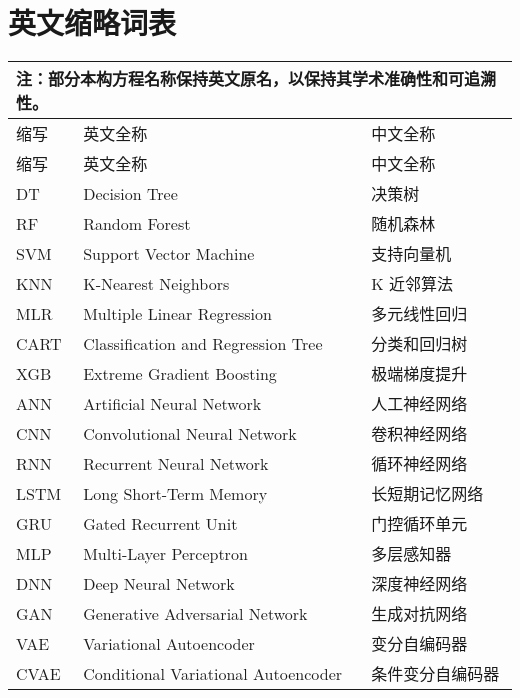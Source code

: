 \chapter{英文缩略词表}
\begin{longtable}{lll}
	\\
	\multicolumn{3}{p{\textwidth}}{\small 注：部分本构方程名称保持英文原名，以保持其学术准确性和可追溯性。}                                        \\
	\hline
	缩写       & 英文全称                                               & 中文全称                                           \\
	\hline
	\endfirsthead
	\hline
	缩写       & 英文全称                                               & 中文全称                                           \\
	\hline
	\endhead
	\hline
	\endfoot
	DT       & Decision Tree                                      & 决策树\tabularnewline
	RF       & Random Forest                                      & 随机森林\tabularnewline
	SVM      & Support Vector Machine                             & 支持向量机\tabularnewline
	KNN      & K-Nearest Neighbors                                & K 近邻算法\tabularnewline
	MLR      & Multiple Linear Regression                         & 多元线性回归\tabularnewline
	CART     & Classification and Regression Tree                 & 分类和回归树\tabularnewline
	XGB      & Extreme Gradient Boosting                          & 极端梯度提升\tabularnewline

	ANN      & Artificial Neural Network                          & 人工神经网络\tabularnewline
	CNN      & Convolutional Neural Network                       & 卷积神经网络\tabularnewline
	RNN      & Recurrent Neural Network                           & 循环神经网络\tabularnewline
	LSTM     & Long Short-Term Memory                             & 长短期记忆网络\tabularnewline
	GRU      & Gated Recurrent Unit                               & 门控循环单元\tabularnewline
	MLP      & Multi-Layer Perceptron                             & 多层感知器\tabularnewline
	DNN      & Deep Neural Network                                & 深度神经网络\tabularnewline

	GAN      & Generative Adversarial Network                     & 生成对抗网络\tabularnewline
	VAE      & Variational Autoencoder                            & 变分自编码器\tabularnewline
	CVAE     & Conditional Variational Autoencoder                & 条件变分自编码器\tabularnewline


\end{longtable}
